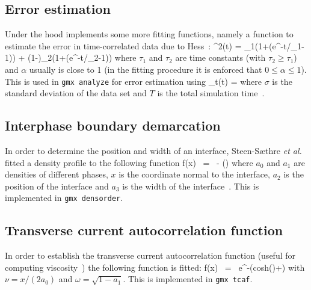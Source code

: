 \subsection{Error estimation}
Under the hood {\gromacs} implements some more fitting functions,
namely a function to estimate the error in time-correlated data due to Hess~\cite{Hess2002a}:
\beq
\varepsilon^2(t) =
\alpha\tau_1\left(1+\left(e^{-t/\tau_1}-1\right)\right)
      + (1-\alpha)\tau_2\left(1+\left(e^{-t/\tau_2}-1\right)\right)
\eeq
where $\tau_1$ and
$\tau_2$ are time constants (with $\tau_2 \ge \tau_1$) and $\alpha$
usually is close to 1 (in the fitting procedure it is enforced that
$0\leq\alpha\leq 1$). This is used in {\tt gmx analyze} for error
estimation using
\beq
\lim_{t\rightarrow\infty}\varepsilon(t) = \sigma{}
\eeq
where $\sigma$ is the standard deviation of the data set and $T$ is
the total simulation time~\cite{Hess2002a}.

\subsection{Interphase boundary demarcation}
In order to determine the position and width of an interface,
Steen-S{\ae}thre {\em et al.} fitted a density profile to the
following function
\beq
f(x) ~=~  - \left(\right)
\eeq
where $a_0$ and $a_1$ are densities of different phases, $x$ is the
coordinate normal to the interface, $a_2$ is the position of the
interface and $a_3$ is the width of the
interface~\cite{Steen-Saethre2014a}.
This is implemented in {\tt gmx densorder}.

\subsection{Transverse current autocorrelation function}
In order to establish the transverse current autocorrelation function
(useful for computing viscosity~\cite{Palmer1994a})
the following function is fitted:
\beq
f(x) ~=~ e^{-\nu}\left({\rm cosh}(\omega\nu)+\right)
\eeq
with $\nu = x/(2a_0)$ and $\omega = \sqrt{1-a_1}$.
This is implemented in {\tt gmx tcaf}.

